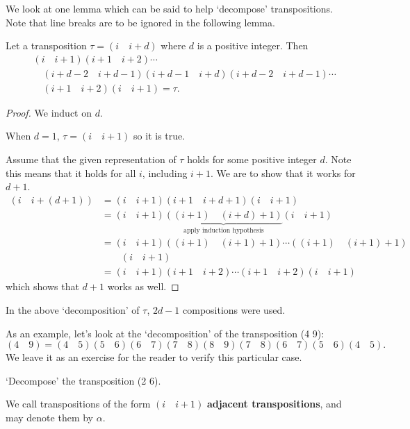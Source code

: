 We look at one lemma which can be said to help `decompose' transpositions. Note that line breaks are to be ignored in the following lemma.
\begin{lemma}\label{lemma-decompose-transposition}
    Let a transposition $\tau = (i\quad i+d)$ where $d$ is a positive integer. Then
    \begin{align*}
        & (i\quad i+1)(i+1\quad i+2)\cdots\\
        &\quad (i+d-2\quad i+d-1)(i+d-1\quad i+d)(i+d-2\quad i+d-1)\cdots\\
        &\quad (i+1\quad i+2)(i\quad i+1) = \tau.
    \end{align*}
\end{lemma}
\begin{proof}
    We induct on $d$.

    When $d = 1$, $\tau = (i\quad i+1)$ so it is true.

    Assume that the given representation of $\tau$ holds for some positive integer $d$. Note this means that it holds for all $i$, including $i+1$. We are to show that it works for $d + 1$.
    \begin{align*}
        (i\quad i+(d+1)) &= (i\quad i+1)(i+1\quad i+d+1)(i\quad i+1)\\
        &= (i\quad i+1)\underbrace{((i+1)\quad (i+d)+1)}_{\text{apply induction hypothesis}}(i\quad i+1)\\
        &= (i\quad i+1)((i+1)\quad(i+1)+1)\cdots((i+1)\quad(i+1)+1)\\
        &\quad\quad(i\quad i+1)\\
        &= (i\quad i+1)(i+1\quad i+2)\cdots(i+1\quad i+2)(i\quad i+1)
    \end{align*}
    which shows that $d+1$ works as well.
\end{proof}
\begin{remark}
    In the above `decomposition' of $\tau$, $2d-1$ compositions were used.
\end{remark}
\begin{example}
    As an example, let's look at the `decomposition' of the transposition (4 9):
    \[
        (4\quad 9) = (4\quad 5)(5\quad 6)(6\quad 7)(7\quad 8)(8\quad 9)(7\quad 8)(6\quad 7)(5\quad 6)(4\quad 5).
    \]
    We leave it as an exercise for the reader to verify this particular case.
\end{example}
\begin{exercise}
    `Decompose' the transposition (2 6).
\end{exercise}
\begin{remark}
    We call transpositions of the form $(i\quad i+1)$ \textbf{adjacent transpositions}, and may denote them by $\alpha$.
\end{remark}

